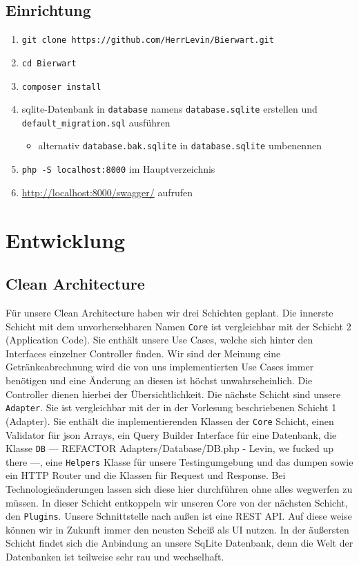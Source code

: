 \documentclass[12pt,a4paper,titlepage,ngerman,pdftex]{report}
\begin{document}
    \section{Einrichtung}\label{sec:einrichtung}

    \begin{enumerate}
        \item \texttt{git clone https://github.com/HerrLevin/Bierwart.git}
        \item \texttt{cd Bierwart}
        \item \texttt{composer install}
        \item sqlite-Datenbank in \texttt{database} namens \texttt{database.sqlite} erstellen und\\ \texttt{default\_migration.sql} ausführen
        \begin{itemize}
            \item alternativ \texttt{database.bak.sqlite} in \texttt{database.sqlite} umbenennen
        \end{itemize}
        \item \texttt{php -S localhost:8000} im Hauptverzeichnis
        \item \url{http://localhost:8000/swagger/} aufrufen
    \end{enumerate}


    \chapter{Entwicklung}\label{ch:entwicklung}
    
    \section{Clean Architecture}
    Für unsere Clean Architecture haben wir drei Schichten geplant. Die innerste Schicht mit dem unvorhersehbaren Namen \verb|Core| ist vergleichbar mit der Schicht 2 (Application Code). Sie enthält unsere Use Cases, welche sich hinter den Interfaces einzelner Controller finden. Wir sind der Meinung eine Getränkeabrechnung wird die  von uns implementierten Use Cases immer benötigen und eine Änderung an diesen ist höchst unwahrscheinlich. Die Controller dienen hierbei der Übersichtlichkeit. Die nächste Schicht sind unsere \verb|Adapter|. Sie ist vergleichbar mit der in der Vorlesung beschriebenen Schicht 1 (Adapter). Sie enthält die implementierenden Klassen der \verb|Core| Schicht, einen Validator für json Arrays, ein Query Builder Interface für eine Datenbank, die Klasse \verb|DB| --- REFACTOR Adapters/Database/DB.php - Levin, we fucked up there ---, eine \verb|Helpers| Klasse für unsere Testingumgebung und das dumpen sowie ein HTTP Router und die Klassen für Request und Response. Bei Technologieänderungen lassen sich diese hier durchführen ohne alles wegwerfen zu müssen. In dieser Schicht entkoppeln wir unseren Core von der nächsten Schicht, den \verb|Plugins|. Unsere Schnittstelle nach außen ist eine REST API. Auf diese weise können wir in Zukunft immer den neusten Scheiß als UI nutzen. In der äußersten Schicht findet sich die Anbindung an unsere SqLite Datenbank, denn die Welt der Datenbanken ist teilweise sehr rau und wechselhaft.
\end{document}
